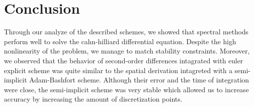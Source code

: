 \documentclass[10pt,a4paper,twocolumn]{article}
\begin{document}
\section{Conclusion} %
\label{sec:conclusion}

Through our analyze of the described schemes, we showed that spectral methods perform well to solve the cahn-hilliard differential equation. Despite the high nonlinearity of the problem, we manage to match stability constraints. Moreover, we observed that the behavior of second-order differences intagrated with euler explicit scheme was quite similar to the spatial derivation intagreted with a semi-implicit Adam-Bashfort scheme. Although their error and the time of integration were close, the semi-implicit scheme was very stable which allowed us to increase accuracy by increasing the amount of discretization points.




\end{document}
